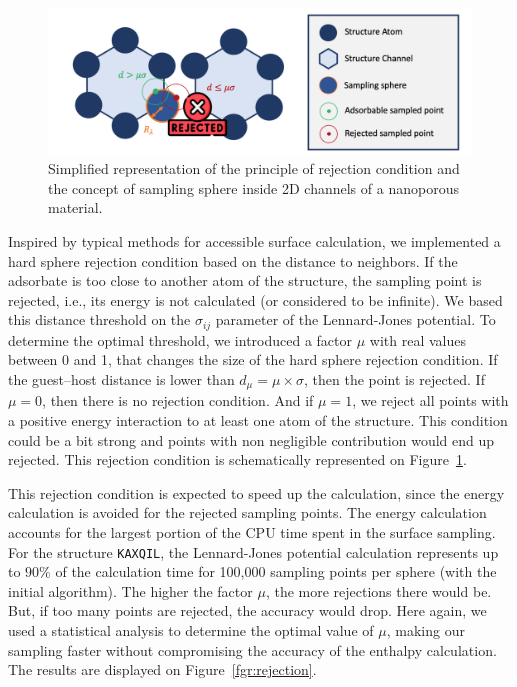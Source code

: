 \documentclass[main]{subfiles}
\begin{document}
\begin{figure}[ht]
\centering
  \includegraphics[width=\linewidth]{figures/3-fastsim/rejection_sampling_sphere.png}
  \caption{Simplified representation of the principle of rejection condition and the concept of sampling sphere inside 2D channels of a nanoporous material.}
  \label{fgr:feature}
\end{figure}

Inspired by typical methods for accessible surface calculation, we implemented a hard sphere rejection condition based on the distance to neighbors. If the adsorbate is too close to another atom of the structure, the sampling point is rejected, i.e., its energy is not calculated (or considered to be infinite). We based this distance threshold on the $\sigma_{ij}$ parameter of the Lennard-Jones potential. To determine the optimal threshold, we introduced a factor $\mu$ with real values between 0 and 1, that changes the size of the hard sphere rejection condition. If the guest--host distance is lower than $d_{\mu} = \mu \times \sigma$, then the point is rejected. If $\mu = 0$, then there is no rejection condition. And if $\mu = 1$, we reject all points with a positive energy interaction to at least one atom of the structure. This condition could be a bit strong and points with non negligible contribution would end up rejected. This rejection condition is schematically represented on Figure~\ref{fgr:feature}.

This rejection condition is expected to speed up the calculation, since the energy calculation is avoided for the rejected sampling points. The energy calculation accounts for the largest portion of the CPU time spent in the surface sampling. For the structure \texttt{KAXQIL}\cite{Banerjee_2012}, the Lennard-Jones potential calculation represents up to $90\%$ of the calculation time for 100,000 sampling points per sphere (with the initial algorithm). The higher the factor $\mu$, the more rejections there would be. But, if too many points are rejected, the accuracy would drop. Here again, we used a statistical analysis to determine the optimal value of $\mu$, making our sampling faster without compromising the accuracy of the enthalpy calculation. The results are displayed on Figure~\ref{fgr:rejection}.
\end{document}
